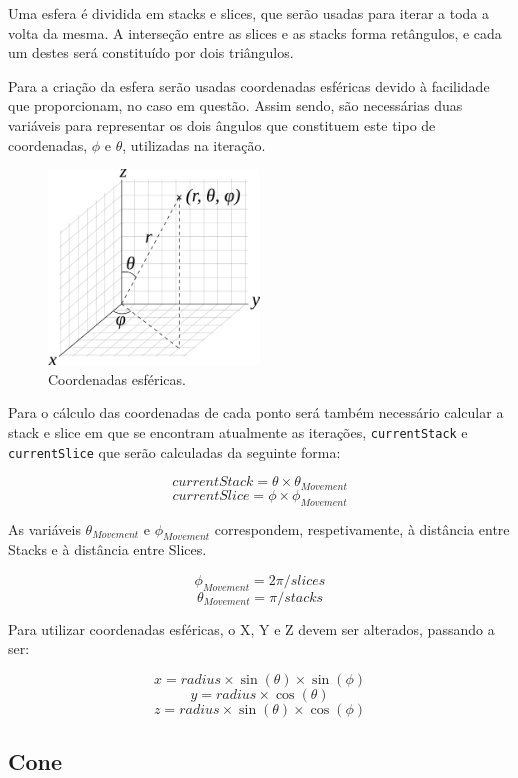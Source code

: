 \documentclass[a4paper]{article}
\newcommand{\x}{\times}
\begin{document}
Uma esfera é dividida em stacks e slices, que serão usadas para iterar a toda a volta da mesma. A interseção entre as slices e as stacks forma retângulos, e cada um destes será constituído por dois triângulos.

Para a criação da esfera serão usadas coordenadas esféricas devido à facilidade que proporcionam, no caso em questão. Assim sendo, são necessárias duas variáveis para representar os dois ângulos que constituem este tipo de coordenadas, $\phi$ e $\theta$, utilizadas na iteração.

\begin{figure}[H]
    \centering
    \includegraphics[width=0.5\textwidth]{coords.png}
    \caption{Coordenadas esféricas.}
\end{figure}

Para o cálculo das coordenadas de cada ponto será também necessário calcular a stack e slice em que se encontram atualmente as iterações, \texttt{currentStack} e \texttt{currentSlice} que serão calculadas da seguinte forma:

\[currentStack = \theta \x \theta_{Movement}\]
\[currentSlice = \phi \x \phi_{Movement}\]

As variáveis $\theta_{Movement}$ e $\phi_{Movement}$ correspondem, respetivamente, à distância entre Stacks e à distância entre Slices.

\[\phi_{Movement} = 2\pi / slices\]
\[\theta_{Movement} = \pi / stacks\]

Para utilizar coordenadas esféricas, o X, Y e Z devem ser alterados, passando a ser:

\[x = radius \x \sin(\theta) \x \sin(\phi)\]
\[y = radius \x \cos(\theta)\]
\[z = radius \x \sin(\theta) \x \cos(\phi)\]

\subsection{Cone}
\end{document}
